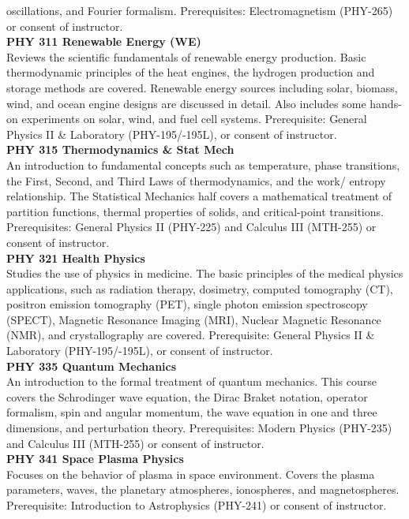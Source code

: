 \documentclass[
  letterpaper,
]{scrbook}
\begin{document}
oscillations, and Fourier formalism. Prerequisites: Electromagnetism
(PHY-265) or consent of instructor.\\
\textbf{PHY 311 Renewable Energy (WE)}\\
Reviews the scientific fundamentals of renewable energy production.
Basic thermodynamic principles of the heat engines, the hydrogen
production and storage methods are covered. Renewable energy sources
including solar, biomass, wind, and ocean engine designs are discussed
in detail. Also includes some hands-on experiments on solar, wind, and
fuel cell systems. Prerequisite: General Physics II \& Laboratory
(PHY-195/-195L), or consent of instructor.\\
\textbf{PHY 315 Thermodynamics \& Stat Mech}\\
An introduction to fundamental concepts such as temperature, phase
transitions, the First, Second, and Third Laws of thermodynamics, and
the work/ entropy relationship. The Statistical Mechanics half covers a
mathematical treatment of partition functions, thermal properties of
solids, and critical-point transitions. Prerequisites: General Physics
II (PHY-225) and Calculus III (MTH-255) or consent of instructor.\\
\textbf{PHY 321 Health Physics}\\
Studies the use of physics in medicine. The basic principles of the
medical physics applications, such as radiation therapy, dosimetry,
computed tomography (CT), positron emission tomography (PET), single
photon emission spectroscopy (SPECT), Magnetic Resonance Imaging (MRI),
Nuclear Magnetic Resonance (NMR), and crystallography are covered.
Prerequisite: General Physics II \& Laboratory (PHY-195/-195L), or
consent of instructor.\\
\textbf{PHY 335 Quantum Mechanics}\\
An introduction to the formal treatment of quantum mechanics. This
course covers the Schrodinger wave equation, the Dirac Braket notation,
operator formalism, spin and angular momentum, the wave equation in one
and three dimensions, and perturbation theory. Prerequisites: Modern
Physics (PHY-235) and Calculus III (MTH-255) or consent of instructor.\\
\textbf{PHY 341 Space Plasma Physics}\\
Focuses on the behavior of plasma in space environment. Covers the
plasma parameters, waves, the planetary atmospheres, ionospheres, and
magnetospheres. Prerequisite: Introduction to Astrophysics (PHY-241) or
consent of instructor.\\
\end{document}
